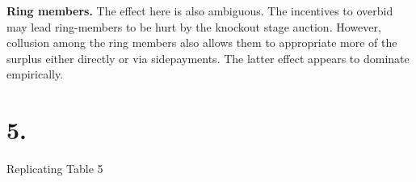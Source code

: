 \documentclass[12pt]{article}
\newcommand{\1}{\mathbbm{1}}
\begin{document}
\textbf{Ring members.} The effect here is also ambiguous. The incentives to overbid may lead ring-members to be hurt by the knockout stage auction. However, collusion among the ring members also allows them to appropriate more of the surplus either directly or via sidepayments. The latter effect appears to dominate empirically. \\

\section*{5.}
\begin{table}[H]
	\centering
	\caption{Replicating Table 5}
	
	\label{tab:my_label}
\end{table}
\end{document}
